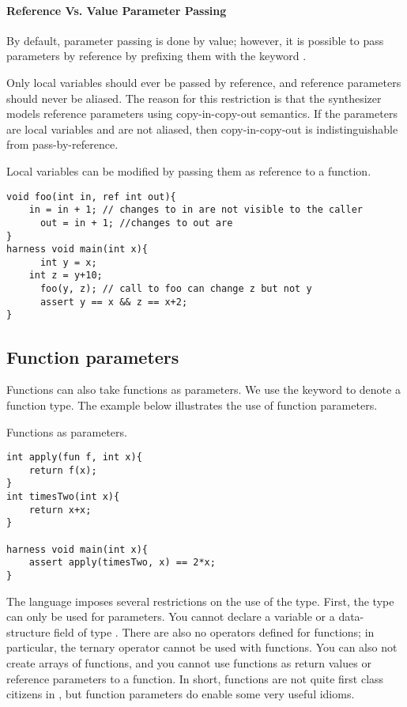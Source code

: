 

\paragraph{Reference Vs. Value Parameter Passing}
By default, parameter passing is done by value; however, it is possible to pass parameters by reference by prefixing them with the keyword . 

Only local variables should ever be passed by reference, and reference parameters should never be aliased. The reason for this restriction is that the synthesizer models reference parameters using copy-in-copy-out semantics. If the parameters are local variables and are not aliased, then copy-in-copy-out is indistinguishable from pass-by-reference.

\begin{Example}
Local variables can be modified by passing them as reference to a function.
\begin{lstlisting}
void foo(int in, ref int out){
	in = in + 1; // changes to in are not visible to the caller
      out = in + 1; //changes to out are 
}
harness void main(int x){
      int y = x;
	int z = y+10;
      foo(y, z); // call to foo can change z but not y
      assert y == x && z == x+2;
}
\end{lstlisting}
\end{Example}


\subsection{Function parameters}
Functions can also take functions as parameters. We use the keyword  to denote a function type. The example below illustrates the use of function parameters.
\begin{Example}
Functions as parameters.
\begin{lstlisting}
int apply(fun f, int x){
	return f(x);
}
int timesTwo(int x){
	return x+x;
}

harness void main(int x){
	assert apply(timesTwo, x) == 2*x;
}
\end{lstlisting}
\end{Example}

The language imposes several restrictions on the use of the  type. First, the type can only be used for parameters. You cannot declare a variable or a data-structure field of type . There are also no operators defined for functions; in particular, the ternary operator  cannot be used with functions. You can also not create arrays of functions, and you cannot use functions as return values or reference parameters to a function. In short, functions are not quite first class citizens in \Sk{}, but function parameters do enable some very useful idioms.

